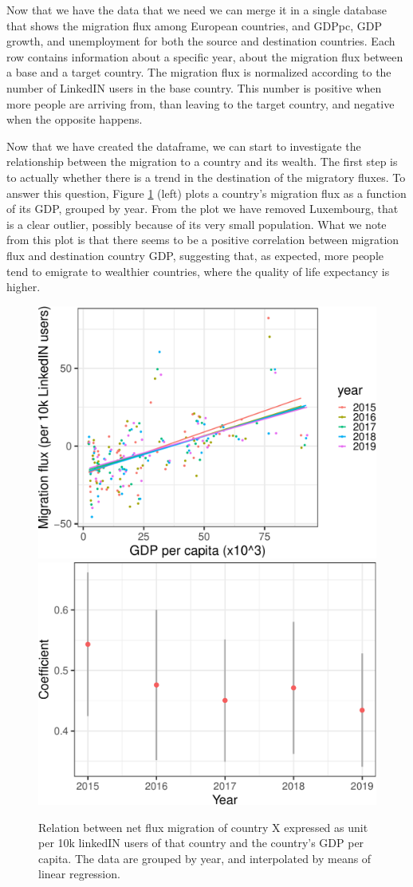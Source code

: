 \documentclass[
]{article}
\begin{document}
Now that we have the data that we need we can merge it in a single
database that shows the migration flux among European countries, and
GDPpc, GDP growth, and unemployment for both the source and destination
countries. Each row contains information about a specific year, about
the migration flux between a base and a target country. The migration
flux is normalized according to the number of LinkedIN users in the base
country. This number is positive when more people are arriving from,
than leaving to the target country, and negative when the opposite
happens.

Now that we have created the dataframe, we can start to investigate the
relationship between the migration to a country and its wealth. The
first step is to actually whether there is a trend in the destination of
the migratory fluxes. To answer this question, Figure
\ref{fig:migration_peryear} (left) plots a country's migration flux as a
function of its GDP, grouped by year. From the plot we have removed
Luxembourg, that is a clear outlier, possibly because of its very small
population. What we note from this plot is that there seems to be a
positive correlation between migration flux and destination country GDP,
suggesting that, as expected, more people tend to emigrate to wealthier
countries, where the quality of life expectancy is higher.

\begin{figure}
\includegraphics[width=0.5\linewidth]{main_files/figure-latex/migration_peryear-1} \includegraphics[width=0.5\linewidth]{main_files/figure-latex/migration_peryear-2} \caption{Relation between net flux migration of country X expressed as unit per 10k linkedIN users of that country and the country's GDP per capita. The data are grouped by year, and interpolated by means of linear regression. \label{fig:migration_peryear}}\label{fig:migration_peryear}
\end{figure}
\end{document}

